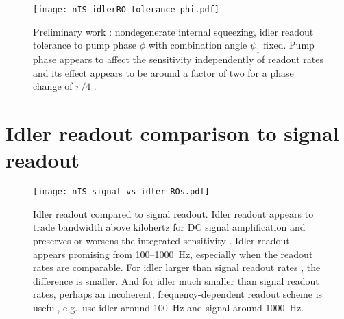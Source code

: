 
\begin{figure}
	\centering
	\texttt{[image: nIS\_idlerRO\_tolerance\_phi.pdf]}
	\caption{  Preliminary work : nondegenerate internal squeezing, idler readout tolerance to pump phase $\phi$ with combination angle $\psi_1$ fixed.   Pump phase appears to affect the sensitivity independently of readout rates and its effect appears to be around a factor of two for a phase change of $\pi/4$ .}
	\label{fig:}
\end{figure}



\section{Idler readout comparison to signal readout}



\begin{figure}
	\centering
	\texttt{[image: nIS\_signal\_vs\_idler\_ROs.pdf]}
	\caption{ Idler readout compared to signal readout. Idler readout appears to trade bandwidth above kilohertz for DC signal amplification and preserves or worsens the integrated sensitivity . Idler readout appears promising from 100--1000~Hz, especially when the readout rates are comparable. For idler larger than signal readout rates , the difference is smaller. And for idler much smaller than signal readout rates, perhaps an incoherent, frequency-dependent readout scheme is useful, e.g.\ use idler around 100~Hz and signal around 1000~Hz. }
	\label{fig:}
\end{figure}

